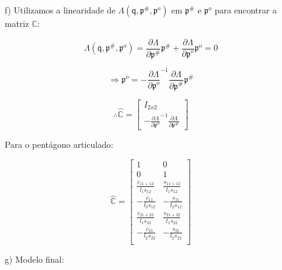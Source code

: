 \documentclass[12pt,a4paper]{article}
\begin{document}
\begin{itemize}
\begin{itemize}
	\item[f)] Utilizamos a linearidade de $\mathsf{\Lambda}(\mathsf{q}, \mathfrak{p}^{\#}, \mathfrak{p}^o)$ em $\mathfrak{p}^{\#}$ e $\mathfrak{p}^o$ para encontrar a matriz $\mathbb{C}$:
	
	\begin{equation}
	\mathsf{\Lambda}(\mathsf{q}, \mathfrak{p}^{\#}, \mathfrak{p}^o) = \frac{\partial \mathsf{\Lambda}}{\partial \mathfrak{p}^{\#}} \mathfrak{p}^{\#} + \frac{\partial \mathsf{\Lambda}}{\partial \mathfrak{p}^o} \mathfrak{p}^o = 0 
	\end{equation}
	
	\begin{equation}
	\Rightarrow\mathfrak{p}^o = - \frac{\partial \mathsf{\Lambda}}{\partial \mathfrak{p}^o}^{-1} \frac{\partial \mathsf{\Lambda}}{\partial \mathfrak{p}^{\#}} \mathfrak{p}^{\#}
	\end{equation}
	
	\begin{equation}
	\therefore \hat{\mathbb{C}} =
	\begin{bmatrix}
	I_{2x2} \\
	- \frac{\partial \mathsf{\Lambda}}{\partial \mathfrak{p}^o}^{-1} \frac{\partial \mathsf{\Lambda}}{\partial \mathfrak{p}^{\#}}
	\end{bmatrix}
	\end{equation}
	
	Para o pentágono articulado:
	
	\begin{equation}
	\hat{\mathbb{C}} =
	\begin{bmatrix}
	1 & 0 \\
	0 & 1 \\
	\frac{c_{11+12}}{l_1 s_{12}} & \frac{s_{11+12}}{l_1 s_{12}} \\
	-\frac{c_{11}}{l_2 s_{12}} & -\frac{s_{11}}{l_2 s_{12}} \\
	\frac{c_{21+22}}{l_1 s_{22}} & \frac{s_{21+22}}{l_1 s_{22}} \\
	-\frac{c_{21}}{l_2 s_{22}} & -\frac{s_{21}}{l_2 s_{22}} \\
	\end{bmatrix}
	\end{equation}
	
	\item[g)] Modelo final:
	
\end{itemize}

\end{itemize}
\end{document}
